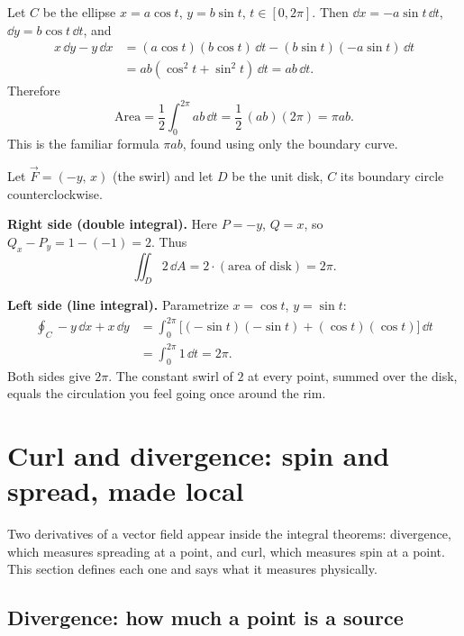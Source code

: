 \begin{example}
\label{ch35:ex-ellipse}
Let $C$ be the ellipse $x=a\cos t$, $y=b\sin t$, $t\in[0,2\pi]$. Then
$\dd x = -a\sin t\,\dd t$, $\dd y = b\cos t\,\dd t$, and
\begin{align*}
  x\,\dd y - y\,\dd x
  &= (a\cos t)(b\cos t)\,\dd t - (b\sin t)(-a\sin t)\,\dd t\\
  &= ab(\cos^2 t + \sin^2 t)\,\dd t = ab\,\dd t.
\end{align*}
Therefore
\[
  \text{Area} = \frac12\int_0^{2\pi} ab\,\dd t = \frac12\,(ab)(2\pi) = \pi ab.
\]
This is the familiar formula $\pi a b$, found using only the boundary curve.
\end{example}

\begin{example}
\label{ch35:ex-green-verify}
Let $\vec F=(-y,\,x)$ (the swirl) and let $D$ be the unit disk, $C$ its boundary
circle counterclockwise.

\textbf{Right side (double integral).} Here $P=-y$, $Q=x$, so
$Q_x - P_y = 1 - (-1) = 2$. Thus
\[
  \iint_D 2\,\dd A = 2\cdot(\text{area of disk}) = 2\pi.
\]

\textbf{Left side (line integral).} Parametrize $x=\cos t$, $y=\sin t$:
\begin{align*}
  \oint_C -y\,\dd x + x\,\dd y
  &= \int_0^{2\pi}\big[(-\sin t)(-\sin t) + (\cos t)(\cos t)\big]\,\dd t\\
  &= \int_0^{2\pi} 1\,\dd t = 2\pi.
\end{align*}
Both sides give $2\pi$. The constant swirl of $2$ at every point,
summed over the disk, equals the circulation you feel going once around the rim.
\end{example}

\section{Curl and divergence: spin and spread, made local}
\label{ch35:curl-div}

Two derivatives of a vector field appear inside the integral theorems:
divergence, which measures spreading at a point, and curl, which measures spin at a
point. This section defines each one and says what it measures physically.

\subsection{Divergence: how much a point is a source}

